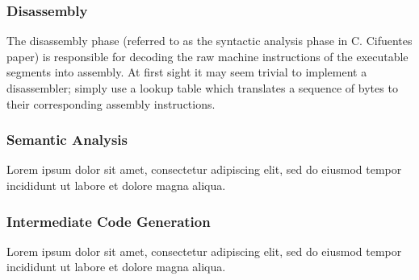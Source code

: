 \documentclass[12pt, a4paper]{article}
\begin{document}
\subsubsection{Disassembly}

The disassembly phase (referred to as the syntactic analysis phase in C. Cifuentes paper) is responsible for decoding the raw machine instructions of the executable segments into assembly. At first sight it may seem trivial to implement a disassembler; simply use a lookup table which translates a sequence of bytes to their corresponding assembly instructions.

%
%
%


\subsubsection{Semantic Analysis}

Lorem ipsum dolor sit amet, consectetur adipiscing elit, sed do eiusmod tempor incididunt ut labore et dolore magna aliqua.



\subsubsection{Intermediate Code Generation}

Lorem ipsum dolor sit amet, consectetur adipiscing elit, sed do eiusmod tempor incididunt ut labore et dolore magna aliqua.
\end{document}
